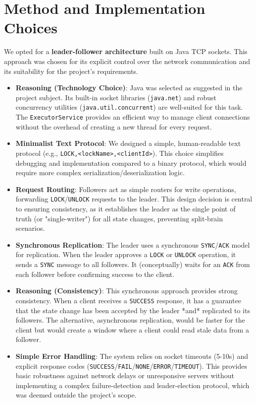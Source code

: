 \documentclass[a4paper,11pt]{article}
\begin{document}
\section{Method and Implementation Choices}
We opted for a \textbf{leader-follower architecture} built on Java TCP sockets. This approach was chosen for its explicit control over the network communication and its suitability for the project's requirements.

\begin{itemize}
    \item \textbf{Reasoning (Technology Choice)}: Java was selected as suggested in the project subject. Its built-in socket libraries (\texttt{java.net}) and robust concurrency utilities (\texttt{java.util.concurrent}) are well-suited for this task. The \texttt{ExecutorService} provides an efficient way to manage client connections without the overhead of creating a new thread for every request.

    \item \textbf{Minimalist Text Protocol}: We designed a simple, human-readable text protocol (e.g., \texttt{LOCK,<lockName>,<clientId>}). This choice simplifies debugging and implementation compared to a binary protocol, which would require more complex serialization/deserialization logic.

    \item \textbf{Request Routing}: Followers act as simple routers for write operations, forwarding \texttt{LOCK}/\texttt{UNLOCK} requests to the leader. This design decision is central to ensuring consistency, as it establishes the leader as the single point of truth (or "single-writer") for all state changes, preventing split-brain scenarios.

    \item \textbf{Synchronous Replication}: The leader uses a synchronous \texttt{SYNC}/\texttt{ACK} model for replication. When the leader approves a \texttt{LOCK} or \texttt{UNLOCK} operation, it sends a \texttt{SYNC} message to all followers. It (conceptually) waits for an \texttt{ACK} from each follower before confirming success to the client.
    
    \item \textbf{Reasoning (Consistency)}: This synchronous approach provides strong consistency. When a client receives a \texttt{SUCCESS} response, it has a guarantee that the state change has been accepted by the leader *and* replicated to its followers. The alternative, asynchronous replication, would be faster for the client but would create a window where a client could read stale data from a follower.

    \item \textbf{Simple Error Handling}: The system relies on socket timeouts (5-10s) and explicit response codes (\texttt{SUCCESS}/\texttt{FAIL}/\texttt{NONE}/\texttt{ERROR}/\texttt{TIMEOUT}). This provides basic robustness against network delays or unresponsive servers without implementing a complex failure-detection and leader-election protocol, which was deemed outside the project's scope.
\end{itemize}
\end{document}
